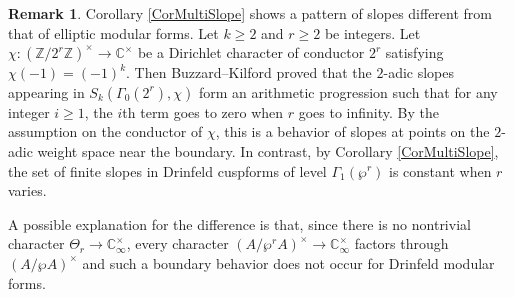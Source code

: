 \documentclass[11pt]{amsart}
\theoremstyle{plain}
\theoremstyle{definition}
\newtheorem{rmk}[thm]{Remark}
\newcommand{\bC}{\mathbb{C}}
\newcommand{\bZ}{\mathbb{Z}}
\newcommand{\Cinf}{\mathbb{C}_{\infty}}
\begin{document}
\begin{rmk}\label{RmkHalo}
	Corollary \ref{CorMultiSlope} shows a pattern of slopes different from that of elliptic modular forms.
	Let $k\geq 2$ and $r\geq 2$ be integers. Let $\chi:(\bZ/2^r\bZ)^\times\to \bC^\times$ be a Dirichlet character of conductor $2^r$
	satisfying $\chi(-1)=(-1)^k$. Then Buzzard--Kilford \cite[Corollary of Theorem B, (i)]{BK} proved that 
	the $2$-adic slopes appearing in $S_k(\Gamma_0(2^r),\chi)$ form
	an arithmetic progression such that for any integer $i\geq 1$, the $i$th term goes to zero when $r$ goes to infinity. 
	By the assumption on the conductor 
	of $\chi$, this is a behavior of slopes at points on the $2$-adic weight space near the boundary.
	In contrast, by Corollary \ref{CorMultiSlope}, the set of finite slopes in Drinfeld cuspforms
	of level $\Gamma_1(\wp^r)$ is constant when $r$ varies.
	
	A possible explanation for the 
	difference
	is that, since there is no nontrivial
	character $
	\Theta_r\to \Cinf^\times $, every character $(A/\wp^r A)^\times\to \Cinf^\times$ factors through $(A/\wp A)^\times$ and such a boundary behavior does not occur 
	for Drinfeld modular forms.
	
\end{rmk}





\end{document}
